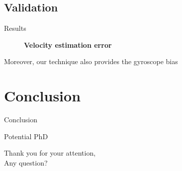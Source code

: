 \documentclass{beamer}
\begin{document}
\subsection{Validation}

\begin{frame}{Results}
  \begin{figure}[h!]
    \centering
    \textbf{Velocity estimation error}\\
    \vspace{1em}

    \resizebox{0.5\textwidth}{!}{}
  \end{figure}

  Moreover, our technique also provides the gyroscope bias

\end{frame}

\section{Conclusion}

\begin{frame}{Conclusion}

\end{frame}

\begin{frame}{Potential PhD}
\end{frame}

\begin{frame}[plain,c]
  \begin{center}
    Thank you for your attention,\\
    Any question?
  \end{center}
\end{frame}



\end{document}
